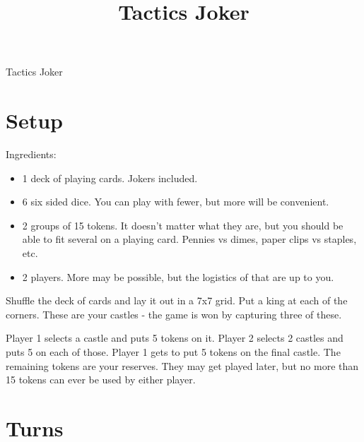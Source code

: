 \documentclass{article}
\title{Tactics Joker}
\begin{document}
%
%
\def \maxarmy {6 }            %
\def \reinforcements {15 }    %
\def \startarmy {5 }          %
\def \recruitroll {6 }        %


\huge
Tactics Joker

\normalsize

\section{Setup}


Ingredients: 
\begin{itemize}
  \item 1 deck of playing cards.  Jokers included.
  \item 6 six sided dice.  You can play with fewer, but more will be convenient.
  \item 2 groups of \reinforcements tokens.  It doesn't matter what they are, but you should be able to fit several on a playing card.  Pennies vs dimes, paper clips vs staples, etc.
  \item 2 players.  More may be possible, but the logistics of that are up to you.
\end{itemize}

Shuffle the deck of cards and lay it out in a 7x7 grid.  Put a king at each of the corners.  These are your castles - the game is won by capturing three of these.

Player 1 selects a castle and puts \startarmy tokens on it.  Player 2 selects 2 castles and puts \startarmy on each of those.  Player 1 gets to put \startarmy tokens on the final castle.  The remaining tokens are your reserves.  They may get played later, but no more than \reinforcements tokens can ever be used by either player.

\section{Turns}
\end{document}

